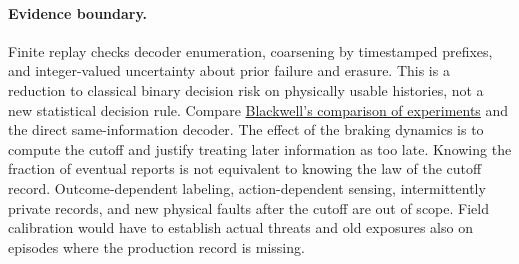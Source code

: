 \documentclass[11pt]{article}
\begin{document}
\paragraph{Evidence boundary.}
Finite replay checks decoder enumeration, coarsening by timestamped prefixes, and integer-valued uncertainty about prior failure and erasure. This is a reduction to classical binary decision risk on physically usable histories, not a new statistical decision rule. Compare \href{https://doi.org/10.1214/aoms/1177729032}{Blackwell's comparison of experiments} and the direct same-information decoder. The effect of the braking dynamics is to compute the cutoff and justify treating later information as too late. Knowing the fraction of eventual reports is not equivalent to knowing the law of the cutoff record. Outcome-dependent labeling, action-dependent sensing, intermittently private records, and new physical faults after the cutoff are out of scope. Field calibration would have to establish actual threats and old exposures also on episodes where the production record is missing.
\end{document}
